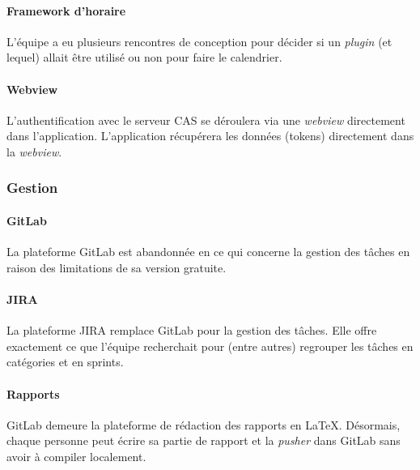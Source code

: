 \paragraph{Framework d'horaire} L'équipe a eu plusieurs rencontres de conception pour décider si un \emph{plugin} (et lequel) allait être utilisé ou non pour faire le calendrier. 

\paragraph{Webview} L'authentification avec le serveur CAS se déroulera via une \emph{webview} directement dans l'application. L'application récupérera les données (tokens) directement dans la \emph{webview}.


\subsubsection{Gestion}

\paragraph{GitLab} La plateforme GitLab est abandonnée en ce qui concerne la gestion des tâches en raison des limitations de sa version gratuite.

\paragraph{JIRA} La plateforme JIRA remplace GitLab pour la gestion des tâches. Elle offre exactement ce que l'équipe recherchait pour (entre autres) regrouper les tâches en catégories et en sprints.

\paragraph{Rapports} GitLab demeure la plateforme de rédaction des rapports en \LaTeX. Désormais, chaque personne peut écrire sa partie de rapport et la \emph{pusher} dans GitLab sans avoir à compiler localement.


